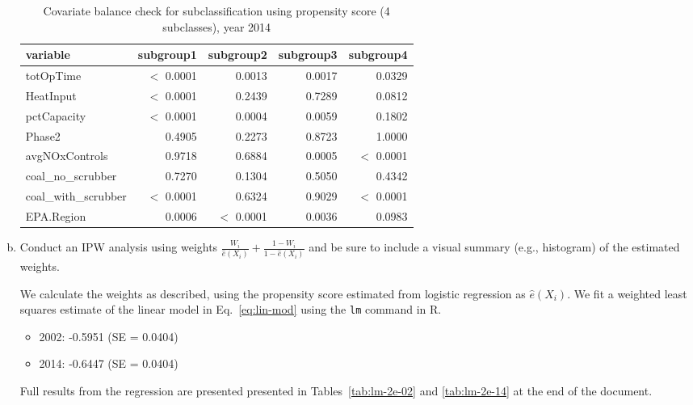 \begin{enumerate}[(a)]
  \begin{table}[ht]
    \centering
    \begin{tabular}{lrrrr}
      \toprule
      variable & subgroup1 & subgroup2 & subgroup3 & subgroup4 \\ 
      \midrule
      totOpTime & $<$ 0.0001 & 0.0013 & 0.0017 & 0.0329 \\ 
      HeatInput & $<$ 0.0001 & 0.2439 & 0.7289 & 0.0812 \\ 
      pctCapacity & $<$ 0.0001 & 0.0004 & 0.0059 & 0.1802 \\ 
      Phase2 & 0.4905 & 0.2273 & 0.8723 & 1.0000 \\ 
      avgNOxControls & 0.9718 & 0.6884 & 0.0005 & $<$ 0.0001 \\ 
      coal\_no\_scrubber & 0.7270 & 0.1304 & 0.5050 & 0.4342 \\ 
      coal\_with\_scrubber & $<$ 0.0001 & 0.6324 & 0.9029 & $<$ 0.0001 \\ 
      EPA.Region & 0.0006 & $<$ 0.0001 & 0.0036 & 0.0983 \\ 
      \bottomrule
    \end{tabular}
    \caption{Covariate balance check for subclassification using propensity score (4 subclasses), year 2014} 
    \label{tab-bal2d-14}
  \end{table}

\item
  \begin{quoting}
    Conduct an IPW analysis using weights
    $\frac{W_i}{\hat e(X_i)} + \frac{1 - W_i}{1 - \hat e(X_i)}$ and be
    sure to include a visual summary (e.g., histogram) of the
    estimated weights.
  \end{quoting}

  We calculate the weights as described, using the propensity score
  estimated from logistic regression as $\hat e(X_i)$.  We fit a
  weighted least squares estimate of the linear model in
  Eq.~\eqref{eq:lin-mod} using the \texttt{lm} command in R.
  \begin{itemize}
  \item 2002: -0.5951 (SE = 0.0404)
  \item 2014: -0.6447 (SE = 0.0404)
  \end{itemize}
  Full results from the regression are presented presented in
  Tables~\ref{tab:lm-2e-02} and \ref{tab:lm-2e-14} at the end of the
  document.
  

\end{enumerate}
